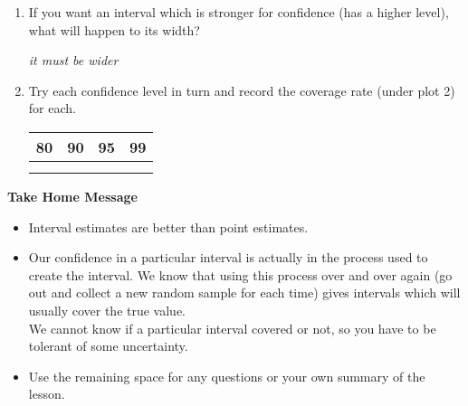 \begin{enumerate}
\item If you want an interval which is stronger for confidence
  (has a higher level), what will happen to its width?
\begin{students}
  \vspace{.6cm}
\end{students}
\begin{key}
  {\it it must be wider}
\end{key}

  \item Try each confidence level in turn and record the coverage rate
    (under plot 2) for each.\\
    \begin{tabular}{|r|r|r|r|} \hline
      {\Large 80} &  {\Large 90} &  {\Large 95} &  {\Large 99}\\ \hline
   {\Large  \phantom{90} } & {\Large \phantom{90}  } &  {\Large
     \phantom{90} } &  {\Large  \phantom{90} } \\
       & & & \\ \hline
    \end{tabular}

  \end{enumerate}


\begin{center}
  {\large \bf Take Home Message} 
\end{center}

\begin{itemize}
\item Interval estimates are better than point estimates.
\item Our confidence in a particular interval is actually in the
  process used to create the interval.  We know that using this
  process over and over again (go out and collect a new random sample
  for each time) gives intervals which will usually
  cover the true value.\\
   We cannot know if a particular interval covered or not, so you have
   to be tolerant of some uncertainty.
 \item 
  Use the remaining space for any questions or your own summary of the
  lesson. 
\end{itemize}




